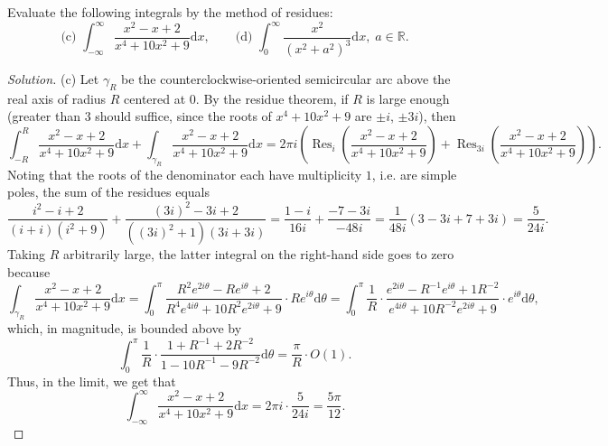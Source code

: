 \documentclass[10pt]{article}
\newcommand{\dd}{\mathrm{d}}
\providecommand{\RR}{\mathbb R}
\newenvironment{soln}{\begin{proof}[Solution]}{\end{proof}}
\begin{document}
\pagebreak
\begin{problem}
    [p.161\#cd]
    Evaluate the following integrals by the method of residues:
    \begin{equation*}
	\text{(c) }\int_{-\infty}^\infty
	\frac{x^2 - x + 2}{x^4 + 10x^2 + 9}\dd x,\qquad
	\text{(d) }\int_0^\infty \frac{x^2}{(x^2 + a^2)^3}\dd x,\; a\in\RR.
    \end{equation*}
\end{problem}

\begin{soln}
    (c) Let $\gamma_R$ be the counterclockwise-oriented
    semicircular arc above the real axis of radius $R$ centered at $0$.
    By the residue theorem, if $R$ is large enough (greater than $3$
    should suffice, since the roots of $x^4 + 10x^2 + 9$
    are $\pm i$, $\pm 3i$), then
    \begin{equation*}
	\int_{-R}^R \frac{x^2 - x + 2}{x^4 + 10x^2 + 9}\dd x
	+ \int_{\gamma_R}\frac{x^2 - x + 2}{x^4 + 10x^2 + 9}\dd x
	= 2\pi i\left(\operatorname{Res}_{i}\left(\frac{x^2 - x + 2}
	{x^4 + 10x^2 + 9}\right)
	+ \operatorname{Res}_{3i}\left(\frac{x^2 - x + 2}
	{x^4 + 10x^2 + 9}\right)\right).
    \end{equation*}
    Noting that the roots of the denominator each have multiplicity $1$,
    i.e. are simple poles, the sum of the residues equals
    \begin{equation*}
	\frac{i^2 - i + 2}{(i+i)(i^2 + 9)}
	+ \frac{(3i)^2 - 3i + 2}{((3i)^2 + 1)(3i + 3i)}
	= \frac{1-i}{16i} + \frac{-7-3i}{-48i}
	= \frac 1{48i}(3 - 3i + 7 + 3i) = \frac 5{24i}.
    \end{equation*}
    Taking $R$ arbitrarily large,
    the latter integral on the right-hand side goes to zero because
    \begin{equation*}
	\int_{\gamma_R}\frac{x^2 - x + 2}{x^4 + 10x^2 + 9}\dd x
	= \int_0^{\pi}\frac{R^2e^{2i\theta} - Re^{i\theta} + 2}
	{R^4e^{4i\theta} + 10R^2e^{2i\theta} + 9}\cdot Re^{i\theta}\dd\theta
	= \int_0^\pi \frac 1{R}\cdot
	\frac{e^{2i\theta}-R^{-1}e^{i\theta}+1R^{-2}}
	{e^{4i\theta} + 10R^{-2}e^{2i\theta} + 9}\cdot e^{i\theta}\dd\theta,
    \end{equation*}
    which, in magnitude, is bounded above by
    \begin{equation*}
	\int_0^\pi \frac 1R\cdot\frac{1 + R^{-1} + 2R^{-2}}
	{1-10R^{-1}-9R^{-2}}\dd\theta
	= \frac \pi R\cdot O(1).
    \end{equation*}
    Thus, in the limit, we get that
    \begin{equation*}
	\int_{-\infty}^\infty \frac{x^2 - x + 2}{x^4 + 10x^2 + 9}\dd x
	= 2\pi i\cdot \frac 5{24i}
	= \boxed{\frac{5\pi}{12}}.
    \end{equation*}


\end{soln}
\end{document}

